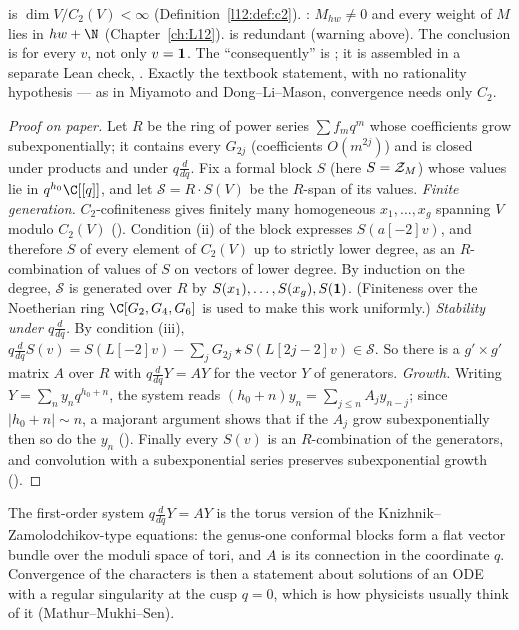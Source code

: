 \begin{dictionary}
 is $\dim V/C_2(V)<\infty$ (Definition~\ref{l12:def:c2}). : $M_{hw}\neq0$
and every weight of $M$ lies in $hw+\N$ (Chapter~\ref{ch:L12}).  is redundant (warning above). The
conclusion is for every $v$, not only $v=\mathbf{1}$. The ``consequently'' is
\allowbreak{}; it is assembled in a separate Lean check, \allowbreak{}. Exactly the
textbook statement, with no rationality hypothesis --- as in Miyamoto and Dong--Li--Mason, convergence needs only $C_2$.
\end{dictionary}

\begin{proof}[Proof on paper]
Let $R$ be the ring of power series $\sum f_mq^m$ whose coefficients grow subexponentially; it contains every $G_{2j}$
(coefficients $O(m^{2j})$) and is closed under products and under $q\frac d{dq}$. Fix a formal block $S$ (here
$S=\mathcal{Z}_M$) whose values lie in $q^{h_0}\C[[q]]$, and let $\mathcal S=R\cdot S(V)$ be the $R$-span of its values.
\emph{Finite generation.} $C_2$-cofiniteness gives finitely many homogeneous $x_1,\dots,x_g$ spanning $V$ modulo $C_2(V)$
(\allowbreak{}). Condition (ii) of the block expresses $S(a[-2]v)$, and therefore $S$ of every
element of $C_2(V)$ up to strictly lower degree, as an $R$-combination of values of $S$ on vectors of lower degree. By
induction on the degree, $\mathcal S$ is generated over $R$ by $S(x_1),\dots,S(x_g),S(\mathbf{1})$. (Finiteness over the
Noetherian ring $\C[G_2,G_4,G_6]$ is used to make this work uniformly.) \emph{Stability under $q\frac d{dq}$.} By
condition (iii), $q\frac d{dq}S(v)=S(L[-2]v)-\sum_jG_{2j}\star S(L[2j-2]v)\in\mathcal S$. So there is a $g'\times g'$ matrix
$A$ over $R$ with $q\frac d{dq}Y=AY$ for the vector $Y$ of generators. \emph{Growth.} Writing $Y=\sum_n y_nq^{h_0+n}$, the
system reads $(h_0+n)y_n=\sum_{j\le n}A_jy_{n-j}$; since $|h_0+n|\sim n$, a majorant argument shows that if the $A_j$ grow
subexponentially then so do the $y_n$ (). Finally every $S(v)$ is an $R$-combination of the
generators, and convolution with a subexponential series preserves subexponential growth
().
\end{proof}

\begin{physics}
The first-order system $q\frac{d}{dq}Y=AY$ is the torus version of the Knizhnik--Zamolodchikov-type equations: the
genus-one conformal blocks form a flat vector bundle over the moduli space of tori, and $A$ is its connection in the
coordinate $q$. Convergence of the characters is then a statement about solutions of an ODE with a regular singularity at
the cusp $q=0$, which is how physicists usually think of it (Mathur--Mukhi--Sen).
\end{physics}

